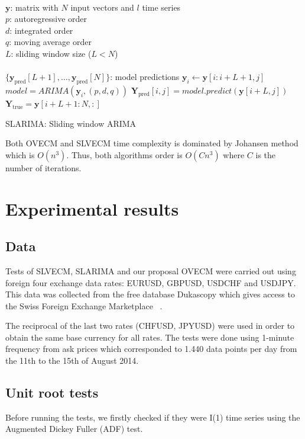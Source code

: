 \begin{algorithm}[ht]
\begin{algorithmic}[1]
\REQUIRE $\,$ \\
$\mathbf{y}$: matrix with $N$ input vectors and $l$ time series\\
$p$: autoregressive order \\
$d$: integrated order\\
$q$: moving average order\\
$L$: sliding window size ($L<N$) \\
\ENSURE  $\,$ \\
$\{ \mathbf{y}_{\text{pred}}[L+1],\dots,\mathbf{y}_{\text{pred}}[N]\}$: model predictions 
    \STATE $\mathbf{y}_i \gets \mathbf{y}[i:i+L+1,j]$
        \STATE $model = ARIMA(\mathbf{y}_i, (p,d,q))$
        \STATE $\mathbf{Y}_{\text{pred}}[i,j] = model.predict(\mathbf{y}[i+L,j])$
\ENDFOR
\ENDFOR
\STATE $\mathbf{Y}_{\text{true}} = \mathbf{y}[i+L+1:N,:] $
\end{algorithmic}
\caption{SLARIMA: Sliding window ARIMA}
\label{alg:SLARIMA}
\end{algorithm}

Both OVECM and SLVECM time complexity is dominated by Johansen method which is
$O(n^3)$. Thus, both algorithms order is $O(Cn^3)$ where $C$ is the number of
iterations. 

\section{Experimental results} \label{sec:52results}

\subsection{Data} \label{sec:unitroot}
Tests of SLVECM, SLARIMA and our proposal OVECM were carried out using foreign
four exchange data rates: EURUSD, GBPUSD, USDCHF and USDJPY. This data was
collected from the free database Dukascopy which gives access to the Swiss
Foreign Exchange Marketplace ~\cite{Dukascopy2014}.

The reciprocal of the last two rates (CHFUSD, JPYUSD) were used in order to
obtain the same base currency for all rates.  The tests were done using
1-minute frequency from ask prices which corresponded to 1.440 data points per
day from the 11th to the 15th of August 2014.

\subsection{Unit root tests} \label{sec:unitroot}
Before running the tests, we firstly checked if they were I(1) time series
using the Augmented Dickey Fuller (ADF) test.

